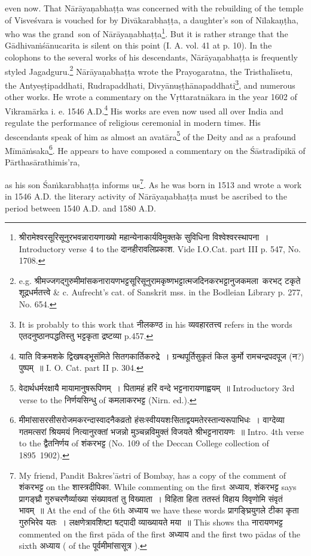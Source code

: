 \documentclass[11pt, openany]{book}
\begin{document}
\noindent
even now. That Nārāyaṇabhaṭṭa was concerned with the rebuilding of the temple of Visveśvara is vouched for by Divākarabhaṭṭa, a daughter's son of Nīlakaṇṭha, who was the grand\textendash\ son of Nārāyaṇabhaṭṭa\renewcommand{\thefootnote}{1}\footnote{श्रीरामेश्वरसूरिसूनुरभवन्नारायणाख्यो महान्येनाकार्यविमुक्तके सुविधिना विश्वेश्वरस्थापना~। Introductory verse 4 to the दानहीरावलिप्रकाश. Vide I.O.Cat. part III p. 547, No. 1708.}. But it is rather strange that the Gādhivaṁśānucarita is silent on this point (I. A. vol. 41 at p. 10). In the colophons to the several works of his descendants, Nārāyaṇabhaṭṭa is frequently styled {\qt Jagadguru}.\renewcommand{\thefootnote}{2}\footnote{e.g. {\qt श्रीमज्जगद्गुरुमीमांसकनारायणभट्टसूरिसूनुरामकृष्णभट्टात्मजदिनकरभट्टानुजकमला\textendash\ करभट् टकृते शूद्रधर्मतत्त्वे} \& c. Aufrecht's cat. of Sanskrit mss. in the Bodleian Library p. 277, No. 654.} Nārāyaṇabhaṭṭa wrote the Prayogaratna, the Tristhalīsetu, the Antyeṣṭipaddhati, Rudrapaddhati, Divyānuṣṭhānapaddhati\renewcommand{\thefootnote}{3}\footnote{It is probably to this work that नीलकण्ठ in his व्यवहारतत्त्व refers in the words {\qt एतदनुष्ठानपद्धतिस्तु भट्टकृता द्रष्टव्या} p.457.}, and numerous other works. He wrote a commentary on the Vṛttaratnākara in the year 1602 of Vikramārka i. e. 1546 A.D.\renewcommand{\thefootnote}{4}\footnote{{\qt याति विक्रमशके द्विखषड्भूसंमिते सितगकार्तिकरुद्रे~। ग्रन्थपूर्तिसुकृतं किल कुर्मो रामचन्द्रपदपूज (न?) पुष्पम्~॥} I. O. Cat. part II p. 304.} His works are even now used all over India and regulate the performance of religious ceremonial in modern times. His descendants speak of him as almost an avatāra\renewcommand{\thefootnote}{5}\footnote{वेदार्थधर्मरक्षायै मायामानुषरूपिणम्~। पितामहं हरिं वन्दे भट्टनारायणाह्वयम्~॥ Introductory 3rd verse to the निर्णयसिन्धु of कमलाकरभट्ट (Nirn. ed.).} of the Deity and as a prafound Mīmāṁsaka\renewcommand{\thefootnote}{6}\footnote{मीमांसासरसीसरोजमकरन्दास्वादनैकव्रतो हंसःस्वीययशःसिताद्वयमतेरस्तान्यरूपाभिधः~। वाग्देव्या गतमत्सरां श्रियमयं नित्यानुरक्तां भजन्नो मुञ्चन्नविमुक्तं विजयते श्रीभट्टनारायणः~॥ Intro. 4th verse to the द्वैतनिर्णय of शंकरभट्ट (No. 109 of the Deccan College collection of 1895\textendash\ 1902).}. He appears to have composed a commentary on the Śāstradīpikā of Pārthasārathimis'ra,

\newpage

\noindent
as his son Śaṁkarabhaṭṭa informs us\renewcommand{\thefootnote}{1}\footnote{My friend, Pandit Bakres'āstri of Bombay, has a copy of the comment of शंकरभट्ट on the शास्त्रदीपिका. While commenting on the first अध्याय, शंकरभट्ट says {\qt प्रागङ्घ्रौ गुरुचरणैर्व्याख्या संख्यावतां तु विख्याता~। विहिता हिता ततस्तं विहाय विवृणोमि संवृतं भावम्~॥} At the end of the 6th अध्याय we have these words {\qt प्रागङ्घ्रियुगले टीका कृता गुरुभिरेव यतः~। लक्षणेत्रावशिष्टा षट्पादी व्याख्यायते मया~॥} This shows tha नारायणभट्ट commented on the first pāda of the first अध्याय and the first two pādas of the sixth अध्याय ( of the पूर्वमीमांसासूत्र ).}. As he was born in 1513 and wrote a work in 1546 A.D. the literary activity of Nārāyaṇabhaṭṭa must be ascribed to the period between 1540 A.D. and 1580 A.D.
\end{document}
